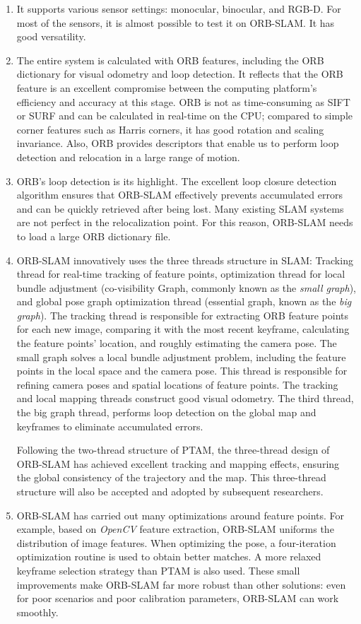 \begin{enumerate}
	\item It supports various sensor settings: monocular, binocular, and RGB-D. For most of the sensors, it is almost possible to test it on ORB-SLAM. It has good versatility.
	\item The entire system is calculated with ORB features, including the ORB dictionary for visual odometry and loop detection. It reflects that the ORB feature is an excellent compromise between the computing platform's efficiency and accuracy at this stage. ORB is not as time-consuming as SIFT or SURF and can be calculated in real-time on the CPU; compared to simple corner features such as Harris corners, it has good rotation and scaling invariance. Also, ORB provides descriptors that enable us to perform loop detection and relocation in a large range of motion.
	\item ORB's loop detection is its highlight. The excellent loop closure detection algorithm ensures that ORB-SLAM effectively prevents accumulated errors and can be quickly retrieved after being lost. Many existing SLAM systems are not perfect in the relocalization point. For this reason, ORB-SLAM needs to load a large ORB dictionary file.
	\item ORB-SLAM innovatively uses the three threads structure in SLAM: Tracking thread for real-time tracking of feature points, optimization thread for local bundle adjustment (co-visibility Graph, commonly known as the \textit{small graph}), and global pose graph optimization thread (essential graph, known as the \textit{big graph}). The tracking thread is responsible for extracting ORB feature points for each new image, comparing it with the most recent keyframe, calculating the feature points' location, and roughly estimating the camera pose. The small graph solves a local bundle adjustment problem, including the feature points in the local space and the camera pose. This thread is responsible for refining camera poses and spatial locations of feature points. The tracking and local mapping threads construct good visual odometry. The third thread, the big graph thread, performs loop detection on the global map and keyframes to eliminate accumulated errors. 
	
	Following the two-thread structure of PTAM, the three-thread design of ORB-SLAM has achieved excellent tracking and mapping effects, ensuring the global consistency of the trajectory and the map. This three-thread structure will also be accepted and adopted by subsequent researchers.
	\item ORB-SLAM has carried out many optimizations around feature points. For example, based on \textit{OpenCV} feature extraction, ORB-SLAM uniforms the distribution of image features. When optimizing the pose, a four-iteration optimization routine is used to obtain better matches. A more relaxed keyframe selection strategy than PTAM is also used. These small improvements make ORB-SLAM far more robust than other solutions: even for poor scenarios and poor calibration parameters, ORB-SLAM can work smoothly.
\end{enumerate}

